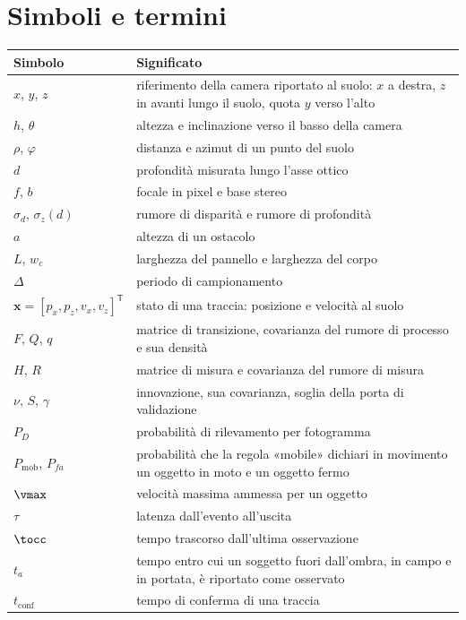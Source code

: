 \section*{Simboli e termini}\label{sec:simboli}

{\small
\begin{tabularx}{\textwidth}{@{}p{2.6cm}L@{}}
\toprule
Simbolo & Significato\\
\midrule
$x$, $y$, $z$ & riferimento della camera riportato al suolo: $x$ a destra, $z$ in avanti lungo il suolo, quota $y$ verso l'alto\\
$h$, $\theta$ & altezza e inclinazione verso il basso della camera\\
$\rho$, $\varphi$ & distanza e azimut di un punto del suolo\\
$d$ & profondità misurata lungo l'asse ottico\\
$f$, $b$ & focale in pixel e base stereo\\
$\sigma_d$, $\sigma_z(d)$ & rumore di disparità e rumore di profondità\\
$a$ & altezza di un ostacolo\\
$L$, $w_c$ & larghezza del pannello e larghezza del corpo\\
$\Delta$ & periodo di campionamento\\
$\mathbf x=[p_x,p_z,v_x,v_z]^{\mathsf T}$ & stato di una traccia: posizione e velocità al suolo\\
$F$, $Q$, $q$ & matrice di transizione, covarianza del rumore di processo e sua densità\\
$H$, $R$ & matrice di misura e covarianza del rumore di misura\\
$\nu$, $S$, $\gamma$ & innovazione, sua covarianza, soglia della porta di validazione\\
$P_D$ & probabilità di rilevamento per fotogramma\\
$P_{\mathrm{mob}}$, $P_{fa}$ & probabilità che la regola «mobile» dichiari in movimento un oggetto in moto e un oggetto fermo\\
$\vmax$ & velocità massima ammessa per un oggetto\\
$\tau$ & latenza dall'evento all'uscita\\
$\tocc$ & tempo trascorso dall'ultima osservazione\\
$t_a$ & tempo entro cui un soggetto fuori dall'ombra, in campo e in portata, è riportato come osservato\\
$t_{\mathrm{conf}}$ & tempo di conferma di una traccia\\

\end{tabularx}}

